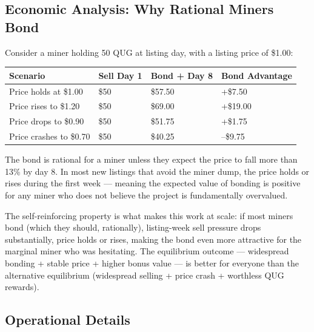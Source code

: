 \documentclass[11pt,a4paper]{article}
\begin{document}
\subsection{Economic Analysis: Why Rational Miners Bond}

Consider a miner holding 50 QUG at listing day, with a listing price of \$1.00:

\begin{center}
\begin{tabular}{L{4cm} C{2.5cm} C{2.5cm} C{3cm}}
  \toprule
  \textbf{Scenario} & \textbf{Sell Day 1} & \textbf{Bond + Day 8} & \textbf{Bond Advantage} \\
  \midrule
  Price holds at \$1.00 & \$50 & \$57.50 & +\$7.50 \\
  Price rises to \$1.20 & \$50 & \$69.00 & +\$19.00 \\
  Price drops to \$0.90 & \$50 & \$51.75 & +\$1.75 \\
  Price crashes to \$0.70 & \$50 & \$40.25 & --\$9.75 \\
  \bottomrule
\end{tabular}
\end{center}

The bond is rational for a miner unless they expect the price to fall more than 13\% by day 8. In most new listings that avoid the miner dump, the price holds or rises during the first week — meaning the expected value of bonding is positive for any miner who does not believe the project is fundamentally overvalued.

The self-reinforcing property is what makes this work at scale: if most miners bond (which they should, rationally), listing-week sell pressure drops substantially, price holds or rises, making the bond even more attractive for the marginal miner who was hesitating. The equilibrium outcome — widespread bonding + stable price + higher bonus value — is better for everyone than the alternative equilibrium (widespread selling + price crash + worthless QUG rewards).

\subsection{Operational Details}
\end{document}
